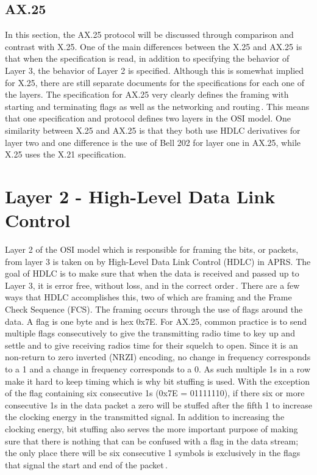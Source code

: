 \subsection{AX.25}
In this section, the AX.25 protocol will be discussed through comparison and contrast with X.25. One of the main differences between the X.25 and AX.25 is that when the specification is read, in addition to specifying the behavior of Layer 3, the behavior of Layer 2 is specified. Although this is somewhat implied for X.25, there are still separate documents for the specifications for each one of the layers. The specification for AX.25 very clearly defines the framing with starting and terminating flags as well as the networking and routing\,\cite{Beech1998}. This means that one specification and protocol defines two layers in the OSI model. One similarity between X.25 and AX.25 is that they both use HDLC derivatives for layer two and one difference is the use of Bell 202 for layer one in AX.25, while X.25 uses the X.21 specification.

\section{Layer 2 - High-Level Data Link Control}
Layer 2 of the OSI model which is responsible for framing the bits, or packets, from layer 3 is taken on by High-Level Data Link Control (HDLC) in APRS. The goal of HDLC is to make sure that when the data is received and passed up to Layer 3, it is error free, without loss, and in the correct order\,\cite{Javvin2006}. There are a few ways that HDLC accomplishes this, two of which are framing and the Frame Check Sequence (FCS). The framing occurs through the use of flags around the data. A flag is one byte and is hex 0x7E. For AX.25, common practice is to send multiple flags consecutively to give the transmitting radio time to key up and settle and to give receiving radios time for their squelch to open. Since it is an non-return to zero inverted (NRZI) encoding, no change in frequency corresponds to a 1 and a change in frequency corresponds to a 0. As such multiple 1s in a row make it hard to keep timing which is why bit stuffing is used. With the exception of the flag containing six consecutive 1s (0x7E = 01111110), if there six or more consecutive 1s in the data packet a zero will be stuffed after the fifth 1 to increase the clocking energy in the transmitted signal. In addition to increasing the clocking energy, bit stuffing also serves the more important purpose of making sure that there is nothing that can be confused with a flag in the data stream; the only place there will be six consecutive 1 symbols is exclusively in the flags that signal the start and end of the packet\,\cite{Horzepa1992}.

